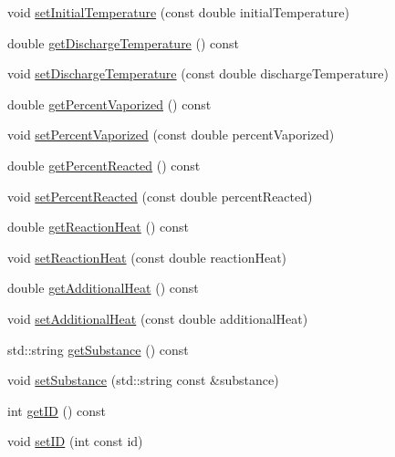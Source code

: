 \begin{DoxyCompactItemize}
void \hyperlink{class_liquid_load_charge_material_ac30600ef82db69934e8c08e4a774bb03}{set\+Initial\+Temperature} (const double initial\+Temperature)
\item 
double \hyperlink{class_liquid_load_charge_material_ad474f33059c99aa94e1d63738e11ff0e}{get\+Discharge\+Temperature} () const
\item 
void \hyperlink{class_liquid_load_charge_material_a04ef0778e524f531b6dd2dd6137c270d}{set\+Discharge\+Temperature} (const double discharge\+Temperature)
\item 
double \hyperlink{class_liquid_load_charge_material_a8e55b0df0a0551671636bcf169228dca}{get\+Percent\+Vaporized} () const
\item 
void \hyperlink{class_liquid_load_charge_material_aaf2aa3303201370a7b79e5b3f54e135a}{set\+Percent\+Vaporized} (const double percent\+Vaporized)
\item 
double \hyperlink{class_liquid_load_charge_material_acfedb26800cbead9bf11c57e1356dd57}{get\+Percent\+Reacted} () const
\item 
void \hyperlink{class_liquid_load_charge_material_a9984b8c78a460ef3569fc3ef13eea604}{set\+Percent\+Reacted} (const double percent\+Reacted)
\item 
double \hyperlink{class_liquid_load_charge_material_a2f0c26e789e98efd1e8fd0c8741ddd92}{get\+Reaction\+Heat} () const
\item 
void \hyperlink{class_liquid_load_charge_material_a793c7ebc2643b2af0eaf21b9cb788775}{set\+Reaction\+Heat} (const double reaction\+Heat)
\item 
double \hyperlink{class_liquid_load_charge_material_a6b79cd1aec59a7f7119a8abfa9e5859b}{get\+Additional\+Heat} () const
\item 
void \hyperlink{class_liquid_load_charge_material_a557c1f588cfb972ff0c7f748d6c2bd8f}{set\+Additional\+Heat} (const double additional\+Heat)
\item 
std\+::string \hyperlink{class_liquid_load_charge_material_a8f925c04c15ed889ba3fd7c4b628dbff}{get\+Substance} () const
\item 
void \hyperlink{class_liquid_load_charge_material_a85bb43270c6a11a1eaf51f00da16746a}{set\+Substance} (std\+::string const \&substance)
\item 
int \hyperlink{class_liquid_load_charge_material_a92591f91c6ed9fdda10733a439e86389}{get\+ID} () const
\item 
void \hyperlink{class_liquid_load_charge_material_a192946f14996795396354f3e15b9e30b}{set\+ID} (int const id)
\item 

\end{DoxyCompactItemize}
